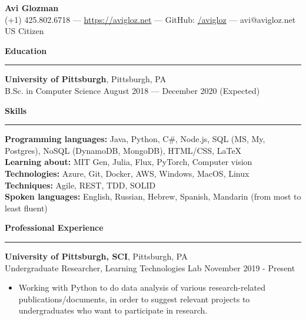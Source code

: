 \documentclass[11pt]{article}
\begin{document}
	\pagestyle{empty}
	\begin{center}
		{\LARGE \textbf{Avi Glozman}}\\
		\vspace{1.5mm}
		{\large (+1) 425.802.6718 --- \href{https://avigloz.net}{https://avigloz.net} --- GitHub: \href{https://github.com/avigloz}{/avigloz} --- avi@avigloz.net}\\
		\vspace{1mm}
		US Citizen
	\end{center}
	
	\begin{flushleft}
		
		\vspace{-1.75mm}
		{\large \raggedright \textbf{Education}}
		\vspace{1.5mm}
	
		\hrule
	
		\vspace{2.25mm}
		\textbf{University of Pittsburgh}, Pittsburgh, PA\\
		{\small B.Sc. in Computer Science \hfill August 2018 --- December 2020 (Expected)}
	
		\vspace{1.75mm}
		{\large \raggedright \textbf{Skills}}
		\vspace{1.5mm}
	
		\hrule
	
		\vspace{2.25mm}
		\textbf{Programming languages:} Java, Python, C\#, Node.js, SQL (MS, My, Postgres), NoSQL (DynamoDB, MongoDB), HTML/CSS, \LaTeX\\
		\textbf{Learning about:} MIT Gen, Julia, Flux, PyTorch, Computer vision\\
		\textbf{Technologies:} Azure, Git, Docker, AWS, Windows, MacOS, Linux\\
		\textbf{Techniques:} Agile, REST, TDD, SOLID\\
		\textbf{Spoken languages:} English, Russian, Hebrew, Spanish, Mandarin (from most to least fluent)
		
		\vspace{1.75mm}
		{\large \raggedright \textbf{Professional Experience}}
		\vspace{1.5mm}
	
		\hrule

		\vspace{2.25mm}
		\textbf{University of Pittsburgh, SCI}, Pittsburgh, PA\\
		{\small Undergraduate Researcher, Learning Technologies Lab \hfill November 2019 - Present}
		\vspace{-1.5mm}
		\begin{itemize}
				\item Working with Python to do data analysis of various research-related publications/documents, in order to suggest relevant projects to undergraduates who want to participate in research.
		\end{itemize}


\end{flushleft}
\end{document}
